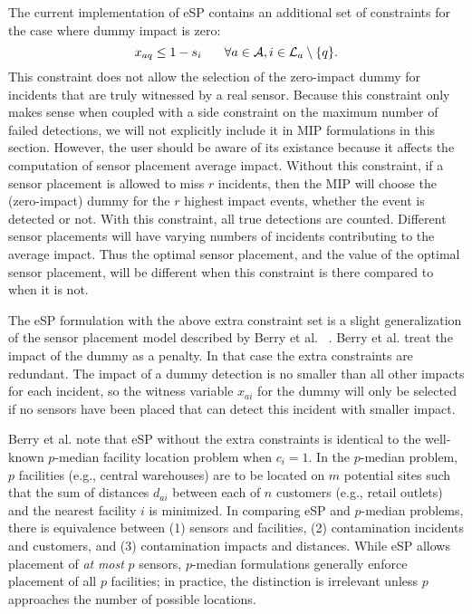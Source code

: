 The current implementation of eSP contains an additional set of constraints for the case where dummy impact is zero:
$$x_{aq} \leq 1-s_i \hspace*{.25in} \forall a \in {\cal A}, i \in {\cal L}_a \setminus \{q\}.$$  This constraint does not allow the selection of the zero-impact dummy for incidents that are truly witnessed by a real sensor.  Because this constraint only makes sense when coupled with a side constraint on the maximum number of failed detections, we will not explicitly include it in MIP formulations in this section.  However, the user should be aware of its existance because it affects the computation of sensor placement average impact.  Without this constraint, if a sensor placement is allowed to miss $r$ incidents, then the MIP will choose the (zero-impact) dummy for the $r$ highest impact events, whether the event is detected or not.  With this constraint, all true detections are counted.  Different sensor placements will have varying numbers of incidents contributing to the average impact.  Thus the optimal sensor placement, and the value of the optimal sensor placement, will be different when this constraint is there compared to when it is not.


The eSP formulation with the above extra constraint set is a slight generalization of the sensor placement model described by Berry et al. ~\cite{BerHarPhiUbeWat06}. Berry et al. treat the impact of the dummy as a penalty.  In that case the extra constraints are redundant. The impact of a dummy detection is no smaller than all other impacts for each incident, so the witness variable $x_{ai}$ for the dummy will only be selected if no sensors have been placed that can detect this incident with smaller impact.

Berry et al. note that eSP without the extra constraints is identical to the well-\/known $p$-\/median facility location problem \citep{MirFra90} when $c_i=1$. In the $p$-\/median problem, $p$ facilities (e.g., central warehouses) are to be located on $m$ potential sites such that the sum of distances $d_{ai}$ between each of $n$ customers (e.g., retail outlets) and the nearest facility $i$ is minimized. In comparing eSP and $p$-\/median problems, there is equivalence between (1) sensors and facilities, (2) contamination incidents and customers, and (3) contamination impacts and distances. While eSP allows placement of {\itshape at\/} {\itshape most\/} $p$ sensors, $p$-\/median formulations generally enforce placement of all $p$ facilities; in practice, the distinction is irrelevant unless $p$ approaches the number of possible locations.

